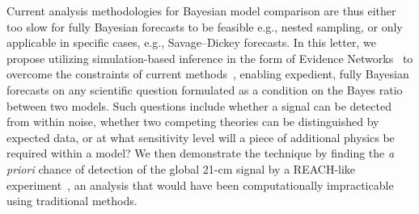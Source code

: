 \documentclass[twocolumn,english,aps,prd,amsmath,amssymb,reprint,floatfix,nofootinbib,showkeys]{revtex4-2}
\newif\ifhighlightchanges
\newcommand{\change}[1]{{\ifhighlightchanges\color{red} #1\else #1\fi}}
\begin{document}
\change{Current} \change{analysis methodologies for Bayesian model comparison are thus either} too slow for \change{fully Bayesian} forecasts to be feasible \change{e.g., nested sampling, or only applicable in specific cases, e.g., Savage–Dickey forecasts}.
\change{In this letter, we propose utilizing simulation-based inference in the form of Evidence Networks~\citep{EN} to overcome the constraints of current methods~\citep{Mukherjee_2006, Trotta_2007b}, enabling} expedient, fully Bayesian forecasts on any scientific question formulated as a condition on the Bayes ratio between two models.
Such questions include whether a signal can be detected from within noise, whether two competing theories can be distinguished by expected data, or at what sensitivity level will a piece of additional physics be required within a model?
We then demonstrate the technique by finding the \textit{a priori} chance of detection of the global 21-cm signal by a REACH-like experiment~\citep{REACH}, an analysis that would have been computationally impracticable using traditional methods.
\end{document}

